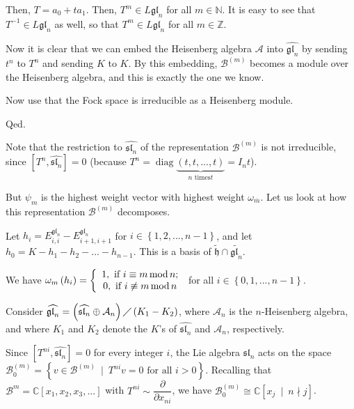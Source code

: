 \documentclass
[numbers=enddot,12pt,final,onecolumn,german,notitlepage]{scrartcl}%
\theoremstyle{definition}
\begin{document}
Then, $T=a_{0}+ta_{1}$. Then, $T^{m}\in L\mathfrak{gl}_{n}$ for all
$m\in\mathbb{N}$. It is easy to see that $T^{-1}\in L\mathfrak{gl}_{n}$ as
well, so that $T^{m}\in L\mathfrak{gl}_{n}$ for all $m\in\mathbb{Z}$.

Now it is clear that we can embed the Heisenberg algebra $\mathcal{A}$ into
$\widehat{\mathfrak{gl}_{n}}$ by sending $t^{n}$ to $T^{n}$ and sending $K$ to
$K$. By this embedding, $\mathcal{B}^{\left(  m\right)  }$ becomes a module
over the Heisenberg algebra, and this is exactly the one we know.

Now use that the Fock space is irreducible as a Heisenberg module.

Qed.

Note that the restriction to $\widehat{\mathfrak{sl}_{n}}$ of the
representation $\mathcal{B}^{\left(  m\right)  }$ is not irreducible, since
$\left[  T^{n},\widehat{\mathfrak{sl}_{n}}\right]  =0$ (because $T^{n}%
=\operatorname*{diag}\underbrace{\left(  t,t,...,t\right)  }_{n\text{ times
}t}=I_{n}t$).

But $\psi_{m}$ is the highest weight vector with highest weight $\omega
_{\overline{m}}$. Let us look at how this representation $\mathcal{B}^{\left(
m\right)  }$ decomposes.

Let $h_{i}=E_{i,i}^{\mathfrak{gl}_{n}}-E_{i+1,i+1}^{\mathfrak{gl}_{n}}$ for
$i\in\left\{  1,2,...,n-1\right\}  $, and let $h_{0}=K-h_{1}-h_{2}%
-...-h_{n-1}$. This is a basis of $\widetilde{\mathfrak{h}}\cap
\widetilde{\mathfrak{gl}_{n}}$.

We have $\omega_{m}\left(  h_{i}\right)  =\left\{
\begin{array}
[c]{c}%
1,\text{ if }i\equiv m\operatorname{mod}n;\\
0,\text{ if }i\not \equiv m\operatorname{mod}n
\end{array}
\right.  $ for all $i\in\left\{  0,1,...,n-1\right\}  $.

Consider $\widehat{\mathfrak{gl}_{n}}=\left(  \widehat{\mathfrak{sl}_{n}%
}\oplus\mathcal{A}_{n}\right)  \diagup\left(  K_{1}-K_{2}\right)  $, where
$\mathcal{A}_{n}$ is the $n$-Heisenberg algebra, and where $K_{1}$ and $K_{2}$
denote the $K$'s of $\widehat{\mathfrak{sl}_{n}}$ and $\mathcal{A}_{n}$, respectively.

Since $\left[  T^{ni},\widehat{\mathfrak{sl}_{n}}\right]  =0$ for every
integer $i$, the Lie algebra $\widehat{\mathfrak{sl}_{n}}$ acts on the space
$\mathcal{B}_{0}^{\left(  m\right)  }=\left\{  v\in\mathcal{B}^{\left(
m\right)  }\ \mid\ T^{ni}v=0\text{ for all }i>0\right\}  $. Recalling that
$\mathcal{B}^{m}=\mathbb{C}\left[  x_{1},x_{2},x_{3},...\right]  $ with
$T^{ni}\sim\dfrac{\partial}{\partial x_{ni}}$, we have $\mathcal{B}%
_{0}^{\left(  m\right)  }\cong\mathbb{C}\left[  x_{j}\ \mid\ n\nmid j\right]
$.
\end{document}
